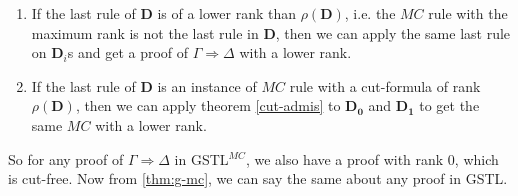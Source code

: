 \begin{enumerate}[label=\Roman*]
	\item If the last rule of $\mathbf{D}$ is of a lower rank than $\rho(\mathbf{D})$, i.e. the $MC$ rule with the maximum rank is not the last rule in $\mathbf{D}$, then we can apply the same last rule on $\mathbf{D}_i$s and get a proof of $\Gamma \Rightarrow \Delta$ with a lower rank.
	
	\item If the last rule of $\mathbf{D}$ is an instance of $MC$ rule with a cut-formula of rank $\rho(\mathbf{D})$, then we can apply theorem \ref{cut-admis} to $\mathbf{D_0}$ and $\mathbf{D_1}$ to get the same $MC$ with a lower rank.
\end{enumerate}
So for any proof of $\Gamma \Rightarrow \Delta$ in GSTL$^{MC}$, we also have a proof with rank $0$, which is cut-free. Now from \ref{thm:g-mc}, we can say the same about any proof in GSTL.